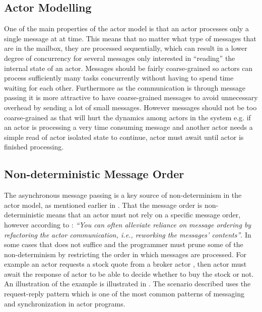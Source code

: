 \subsection{Actor Modelling}\label{ssec:actor_modelling}
One of the main properties of the actor model is that an actor processes only a single message at at time. This means that no matter what type of messages that are in the mailbox, they are processed sequentially, which can result in a lower degree of concurrency for several messages only interested in ``reading'' the internal state of an actor. Messages should be fairly coarse-grained so actors can process sufficiently many tasks concurrently without having to spend time waiting for each other\cite[p. 269]{karmani2009actor}. Furthermore as the communication is through message passing it is more attractive to have coarse-grained messages to avoid unnecessary overhead by sending a lot of small messages. However messages should not be too coarse-grained as that will hurt the dynamics among actors in the system e.g. if an actor  is processing a very time consuming message and another actor  needs a simple read of actor  isolated state to continue, actor  must await until actor  is finished processing.

\subsection{Non-deterministic Message Order}\label{ssec:nondeter_msg_order}
The asynchronous message passing is a key source of non-determinism in the actor model, as mentioned earlier in . That the message order is non-deterministic means that an actor must not rely on a specific message order, however according to \cite[p. 35]{haller2012actors}: \textit{``You can often alleviate reliance on message ordering by refactoring the actor communication, i.e., reworking the messages' contents''}. In some cases that does not suffice and the programmer must prune some of the non-determinism by restricting the order in which messages are processed. For example an actor  requests a stock quote from a broker actor , then actor  must await the response of actor  to be able to decide whether to buy the stock or not. An illustration of the example is illustrated in . The scenario described uses the request-reply pattern which is one of the most common patterns of messaging and synchronization in actor programs\cite[p. 5]{karmani2009actor}.

